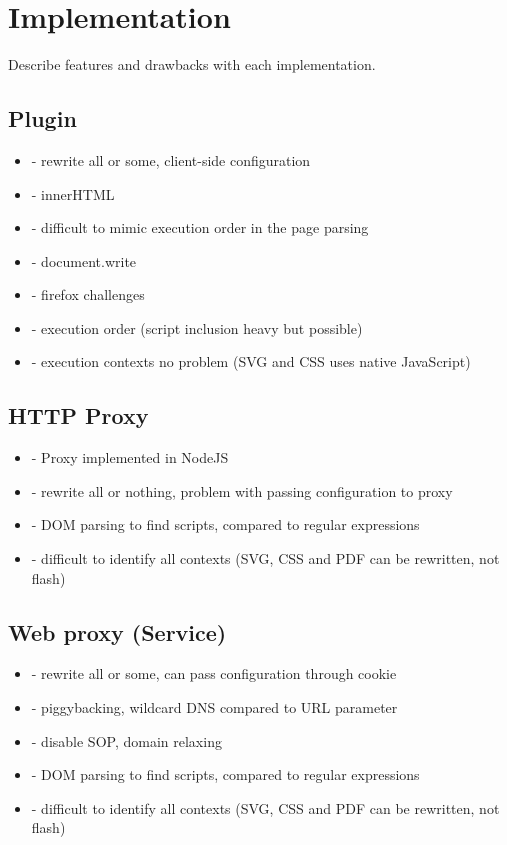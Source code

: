 \documentclass{llncs}
\begin{document}
\section{Implementation}
\label{sec:impl}

Describe features and drawbacks with each implementation.


\subsection{Plugin}

\begin{itemize}
\item- rewrite all or some, client-side configuration
\item- innerHTML
\item- difficult to mimic execution order in the page parsing
\item- document.write
\item- firefox challenges
\item- execution order (script inclusion heavy but possible)
\item- execution contexts no problem (SVG and CSS uses native JavaScript)
\end{itemize}

\subsection{HTTP Proxy}

\begin{itemize}
\item- Proxy implemented in NodeJS
\item- rewrite all or nothing, problem with passing configuration to proxy
\item- DOM parsing to find scripts, compared to regular expressions
\item- difficult to identify all contexts (SVG, CSS and PDF can be rewritten, not flash)
\end{itemize}



\subsection{Web proxy (Service)}

\begin{itemize}
\item- rewrite all or some, can pass configuration through cookie
\item- piggybacking, wildcard DNS compared to URL parameter
\item- disable SOP, domain relaxing
\item- DOM parsing to find scripts, compared to regular expressions
\item- difficult to identify all contexts (SVG, CSS and PDF can be rewritten, not flash)
\end{itemize}
\end{document}
